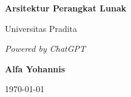 \documentclass[11pt]{book}
\begin{document}
	
	\begin{titlepage}
		\centering
		\vspace*{1cm}
		
		\Huge
		\textbf{Arsitektur Perangkat Lunak}
		
		\vspace{0.5cm}
		
		\LARGE
		Universitas Pradita
		
		\vspace{1.5cm}
		
		\textit{Powered by ChatGPT}
		
		\vspace{2cm}
		
		\textbf{Alfa Yohannis}
		
		\vspace{0.8cm}
		
		\today
		
		\vfill
	\end{titlepage}
	
	\tableofcontents
	
%
%
%
%
%
%
%
%
%
%
%


\backmatter
{}
%

\end{document}
